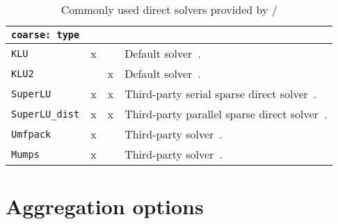\begin{table}[tbh]
  \begin{center}
    \begin{tabular}{p{4.0cm} c c p{7cm}}
      \toprule
      \texttt{coarse: type}             & \amesos{} & \amesostwo{} &  \\
      \midrule
      \verb|KLU|                        & x & & Default \amesos{} solver~\cite{klu}. \\
      \verb|KLU2|                       & & x & Default \amesostwo{} solver~\cite{amesos2_belos}. \\
      \verb|SuperLU|                    & x & x & Third-party serial sparse direct solver~\cite{Li2011}. \\
      \verb|SuperLU_dist|               & x & x & Third-party parallel sparse direct solver~\cite{Li2011}. \\
      \verb|Umfpack|                    & x & & Third-party solver~\cite{umfpack}. \\
      \verb|Mumps|                      & x & & Third-party solver~\cite{mumps}. \\
      \bottomrule
    \end{tabular}
    \caption{Commonly used direct solvers provided by \amesos{}/\amesostwo{}}
\label{tab:coarse}
  \end{center}
\end{table}



\section{Aggregation options}
\label{sec:options_aggregation}

